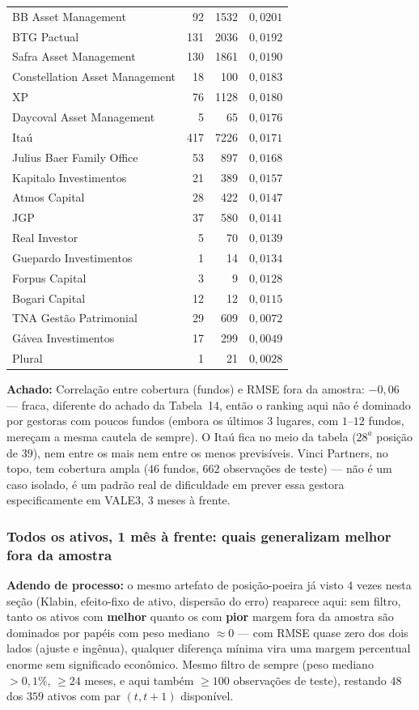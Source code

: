 \documentclass[11pt,a4paper]{article}
\newcommand{\aha}[1]{\par\vspace{4pt}\noindent\textbf{\color{vermelho}Achado:} #1\par\vspace{2pt}}
\begin{document}
\begin{center}
\begin{longtable}{@{}lrrr@{}}
BB Asset Management & 92 & 1532 & $0{,}0201$ \\
BTG Pactual & 131 & 2036 & $0{,}0192$ \\
Safra Asset Management & 130 & 1861 & $0{,}0190$ \\
Constellation Asset Management & 18 & 100 & $0{,}0183$ \\
XP & 76 & 1128 & $0{,}0180$ \\
Daycoval Asset Management & 5 & 65 & $0{,}0176$ \\
Itaú & 417 & 7226 & $0{,}0171$ \\
Julius Baer Family Office & 53 & 897 & $0{,}0168$ \\
Kapitalo Investimentos & 21 & 389 & $0{,}0157$ \\
Atmos Capital & 28 & 422 & $0{,}0147$ \\
JGP & 37 & 580 & $0{,}0141$ \\
Real Investor & 5 & 70 & $0{,}0139$ \\
Guepardo Investimentos & 1 & 14 & $0{,}0134$ \\
Forpus Capital & 3 & 9 & $0{,}0128$ \\
Bogari Capital & 12 & 12 & $0{,}0115$ \\
TNA Gestão Patrimonial & 29 & 609 & $0{,}0072$ \\
Gávea Investimentos & 17 & 299 & $0{,}0049$ \\
Plural & 1 & 21 & $0{,}0028$ \\
\end{longtable}
\end{center}

\aha{Correlação entre cobertura (fundos) e RMSE fora da amostra: $-0{,}06$ --- fraca, diferente do
achado da Tabela~14, então o ranking aqui não é dominado por gestoras com poucos fundos (embora
os últimos 3 lugares, com $1$--$12$ fundos, mereçam a mesma cautela de sempre). O Itaú fica no meio
da tabela ($28^a$ posição de $39$), nem entre os mais nem entre os menos previsíveis. Vinci
Partners, no topo, tem cobertura ampla ($46$ fundos, $662$ observações de teste) --- não é um caso
isolado, é um padrão real de dificuldade em prever essa gestora especificamente em VALE3, $3$
meses à frente.}

\subsubsection*{Todos os ativos, 1 mês à frente: quais generalizam melhor fora da amostra}

\textbf{Adendo de processo:} o mesmo artefato de posição-poeira já visto $4$ vezes nesta seção
(Klabin, efeito-fixo de ativo, dispersão do erro) reaparece aqui: sem filtro, tanto os ativos com
\textbf{melhor} quanto os com \textbf{pior} margem fora da amostra são dominados por papéis com
peso mediano ${\approx}0$ --- com RMSE quase zero dos dois lados (ajuste e ingênua), qualquer
diferença mínima vira uma margem percentual enorme sem significado econômico. Mesmo filtro de
sempre (peso mediano $>0{,}1\%$, $\geq24$ meses, e aqui também $\geq100$ observações de teste),
restando $48$ dos $359$ ativos com par $(t,t{+}1)$ disponível.
\end{document}
